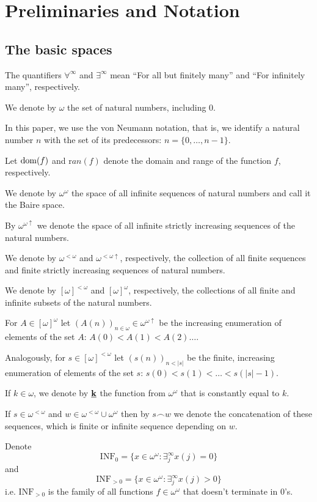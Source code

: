 \documentclass[12pt]{amsart}
\theoremstyle{plain}
\theoremstyle{definition}
\theoremstyle{remark}
\newcommand{\baire}{\omega^{\omega}}
\newcommand{\dom}{{\rm dom}}
\newcommand{\finsub}{[\omega]^{<\omega}}
\newcommand{\finbaire}{\omega^{<\omega}}
\newcommand{\finincrbaire}{\omega^{< \omega \uparrow}}
\newcommand{\incrbaire}{\omega^{\omega \uparrow}}
\newcommand{\infsub}{[\omega]^{\omega}}
\newcommand{\ran}{{\mathrm ran}}
\newcommand{\INFZero}{\mathrm{INF}_0}
\newcommand{\INFNonZero}{\mathrm{INF}_{>0}}
\begin{document}
\section{Preliminaries and Notation}
\subsection{The basic spaces}
The quantifiers
$\forall^\infty$ and $\exists^\infty$ mean
``For all but finitely many'' and
``For infinitely many'', respectively.

We denote by $\omega$ the set of natural numbers, including $0$.

In this paper, we use the von Neumann notation,
that is, we identify a natural number $n$ with the set of its predecessors:
$n = \lbrace 0, \ldots, n - 1\rbrace$.

Let $\dom(f)$ and $\ran(f)$ denote the domain and range of the function $f$, respectively.

We denote by $\baire$ the space of all infinite sequences of
natural numbers and call it the Baire space.

By $\incrbaire$ we denote the space of all infinite strictly increasing
sequences of the natural numbers.

We denote by $\finbaire$ and $\finincrbaire$, respectively,
the collection of all finite sequences and finite strictly increasing
sequences of natural numbers.

We denote by $\finsub$ and $\infsub$, respectively,
the collections of all finite and infinite subsets of the natural numbers.

For $A \in \infsub$ let
$(A(n))_{n\in\omega} \in \incrbaire$ be the increasing enumeration
of elements of the set $A$: $A(0) < A(1) < A(2) \ldots$.

Analogously, for $s \in \finsub$ let
$(s(n))_{n < |s|}$ be the finite, increasing enumeration
of elements of the set $s$: $s(0) < s(1) < \ldots < s(|s| - 1)$.

If $k\in\omega$, we denote by $\underline{\bf k}$ the 
function from $\baire$ that is constantly equal to $k$.

If $s \in \finbaire$ and $w \in \finbaire \cup \baire$
then by $s \frown w$ we denote the concatenation of these sequences,
which is finite or infinite sequence depending on $w$.

Denote \[\INFZero = \lbrace x \in \baire\colon \exists_j^\infty x(j) = 0\rbrace\]
and 
\[\INFNonZero = \lbrace x \in \baire\colon \exists_j^\infty x(j) > 0\rbrace\]
i.e.
$\INFNonZero$ is the family of all functions $f\in \baire$ that doesn't terminate in $0$'s.
\end{document}
